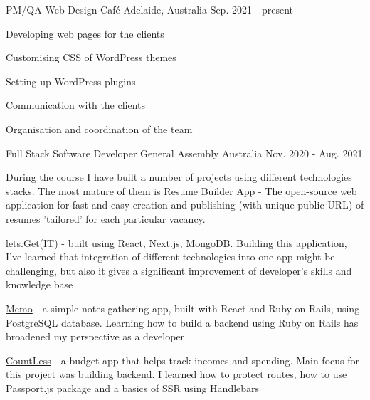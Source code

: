 

\begin{cventries}
  \cventry
    {PM/QA} %
    {Web Design Café} %
    {Adelaide, Australia} %
    {Sep. 2021 - present} %
    {
      \begin{cvitems} 
      \item {Developing web pages for the clients}
      \item {Customising CSS of WordPress themes}
      \item {Setting up WordPress plugins}
      \item {Communication with the clients}
      \item {Organisation and coordination of the team}
      \end{cvitems}
    }




  \cventry
    {Full Stack Software Developer} %
    {General Assembly} %
    {Australia} %
    {Nov. 2020 - Aug. 2021} %
    {
    {
    During the course I have built a number of projects using different technologies stacks. The most mature of them is Resume Builder App - The open-source web application for fast and easy creation and publishing (with unique public URL) of resumes 'tailored' for each particular vacancy.
    }
    \begin{cvparagraph}
    \end{cvparagraph}
      \begin{cvitems} %
        \item {\textcolor{awesome}{\href{https://github.com/olimstv/resume-builder-app}{lets.Get(IT)}} - built using React, Next.js, MongoDB. Building this application, I've learned that integration of different technologies into one app might be challenging, but also it gives a significant improvement of developer's skills and knowledge base}
        \item {\textcolor{awesome}{\href{https://github.com/olimstv/rails_notes_app}{Memo}} - a simple notes-gathering app, built with React and Ruby on Rails, using PostgreSQL database. Learning how to build a backend using Ruby on Rails has broadened my perspective as a developer}
        \item {\textcolor{awesome}{\href{https://github.com/olimstv/countless_app_v2.0}{CountLess}} - a budget app that helps track incomes and spending. Main focus for this project was building backend. I learned how to protect routes, how to use Passport.js package and  a basics of SSR using Handlebars}
      \end{cvitems}
    }


\end{cventries}

